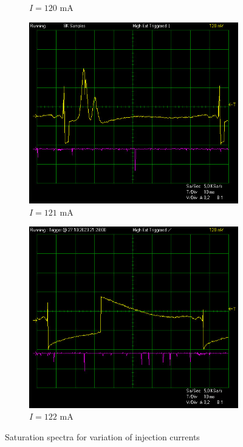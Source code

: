 \documentclass{article}
\begin{document}
\begin{figure}[h]
\begin{subfigure}[b]{0.3\textwidth}
        \caption{$I=120$ mA}
        \label{fig:120mA}
    \end{subfigure}
    \begin{subfigure}[b]{0.3\textwidth}
        \includegraphics[width=\textwidth]{Figures/2/Tconst20C/121mA.jpg}
        \caption{$I=121$ mA}
        \label{fig:121mA}
    \end{subfigure}
    \begin{subfigure}[b]{0.3\textwidth}
        \includegraphics[width=\textwidth]{Figures/2/Tconst20C/122mA.jpg}
        \caption{$I=122$ mA}
        \label{fig:122mA}
    \end{subfigure}
    \caption{Saturation spectra for variation of injection currents}
    \label{fig:VariedCurrent}
\end{figure}
\end{document}
